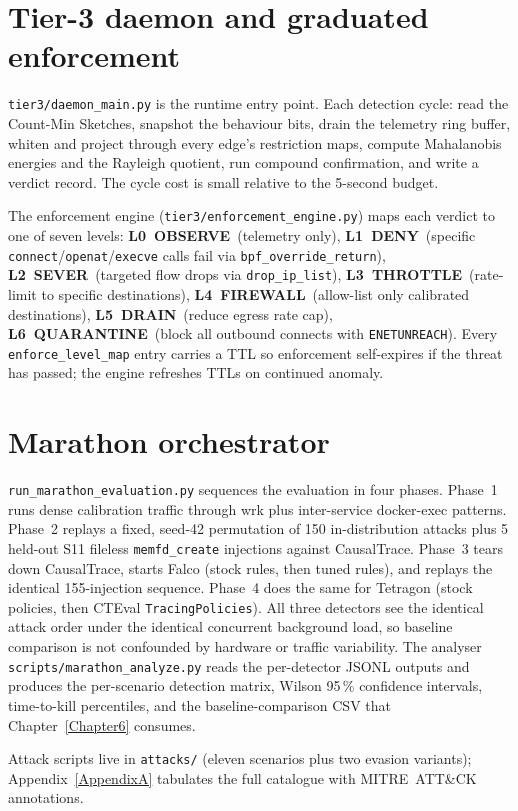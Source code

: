 \section{Tier-3 daemon and graduated enforcement}
\label{sec:daemon}

\texttt{tier3/daemon\_main.py} is the runtime entry point. Each detection
cycle: read the Count-Min Sketches, snapshot the behaviour bits, drain the
telemetry ring buffer, whiten and project through every edge's restriction
maps, compute Mahalanobis energies and the Rayleigh quotient, run compound
confirmation, and write a verdict record. The cycle cost is small relative
to the 5-second budget.

The enforcement engine (\texttt{tier3/enforcement\_engine.py}) maps each
verdict to one of seven levels:
\textbf{L0~OBSERVE}~(telemetry only),
\textbf{L1~DENY}~(specific \texttt{connect}/\texttt{openat}/\texttt{execve}
calls fail via \texttt{bpf\_override\_return}),
\textbf{L2~SEVER}~(targeted flow drops via \texttt{drop\_ip\_list}),
\textbf{L3~THROTTLE}~(rate-limit to specific destinations),
\textbf{L4~FIREWALL}~(allow-list only calibrated destinations),
\textbf{L5~DRAIN}~(reduce egress rate cap),
\textbf{L6~QUARANTINE}~(block all outbound connects with
\texttt{ENETUNREACH}).
Every \texttt{enforce\_level\_map} entry carries a TTL so enforcement
self-expires if the threat has passed; the engine refreshes TTLs on
continued anomaly.

\section{Marathon orchestrator}
\label{sec:marathon}

\texttt{run\_marathon\_evaluation.py} sequences the evaluation in four
phases. Phase~1 runs dense calibration traffic through wrk plus
inter-service docker-exec patterns. Phase~2 replays a fixed, seed-42
permutation of 150 in-distribution attacks plus 5 held-out S11 fileless
\texttt{memfd\_create} injections against CausalTrace. Phase~3 tears down
CausalTrace, starts Falco (stock rules, then tuned rules), and replays the
identical 155-injection sequence. Phase~4 does the same for Tetragon
(stock policies, then CTEval \texttt{TracingPolicies}). All three detectors
see the identical attack order under the identical concurrent background
load, so baseline comparison is not confounded by hardware or traffic
variability. The analyser \texttt{scripts/marathon\_analyze.py} reads the
per-detector JSONL outputs and produces the per-scenario detection matrix,
Wilson 95\,\% confidence intervals, time-to-kill percentiles, and the
baseline-comparison CSV that Chapter~\ref{Chapter6} consumes.

Attack scripts live in \texttt{attacks/} (eleven scenarios plus two evasion
variants); Appendix~\ref{AppendixA} tabulates the full catalogue with
MITRE~ATT\&CK annotations.
